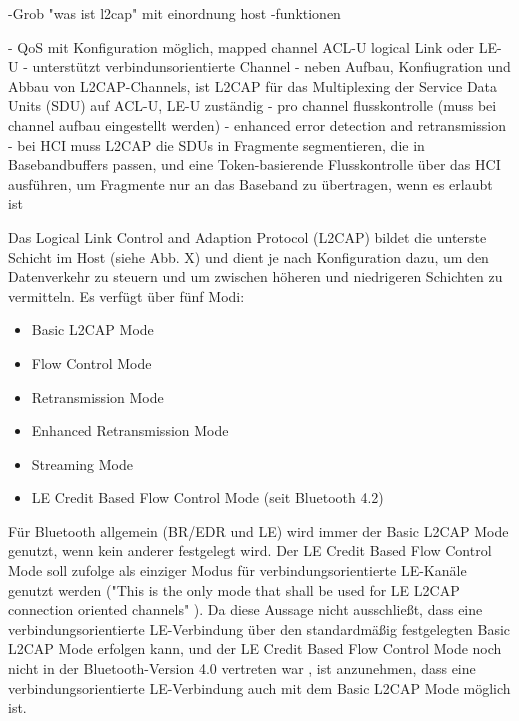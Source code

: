 -Grob "was ist l2cap" mit einordnung host
-funktionen

- QoS mit Konfiguration möglich, mapped channel ACL-U logical Link oder LE-U
- unterstützt verbindunsorientierte Channel
- neben Aufbau, Konfiugration und Abbau von L2CAP-Channels, ist L2CAP für das Multiplexing der Service Data Units (SDU) auf ACL-U, LE-U zuständig
- pro channel flusskontrolle (muss bei channel aufbau eingestellt werden)
- enhanced error detection and retransmission
- bei HCI muss L2CAP die SDUs in Fragmente segmentieren, die in Basebandbuffers passen, und eine Token-basierende Flusskontrolle über das HCI ausführen, um Fragmente nur an das Baseband zu übertragen, wenn es erlaubt ist

Das Logical Link Control and Adaption Protocol (L2CAP) bildet die unterste Schicht im Host (siehe Abb. X) 
und dient je nach Konfiguration dazu, um den Datenverkehr zu steuern und um zwischen höheren und niedrigeren Schichten zu vermitteln.
Es verfügt über fünf Modi:
\begin{itemize}
    \item Basic L2CAP Mode
    \item Flow Control Mode
    \item Retransmission Mode
    \item Enhanced Retransmission Mode
    \item Streaming Mode
    \item LE Credit Based Flow Control Mode (seit Bluetooth 4.2)
\end{itemize}
Für Bluetooth allgemein (BR/EDR und LE) wird immer der Basic L2CAP Mode genutzt, wenn kein anderer festgelegt wird. Der LE Credit Based Flow Control Mode soll \cite{BtSpec4.2_1735} zufolge als einziger Modus für verbindungsorientierte LE-Kanäle genutzt werden ("This is the only mode that shall be used for LE L2CAP connection oriented channels" \cite{BtSpec4.2_1735}). Da diese Aussage nicht ausschließt, dass eine verbindungsorientierte LE-Verbindung über den standardmäßig festgelegten Basic L2CAP Mode erfolgen kann, und der LE Credit Based Flow Control Mode noch nicht in der Bluetooth-Version 4.0 vertreten war \cite{BtSpec4.0_1401}, ist anzunehmen, dass eine verbindungsorientierte LE-Verbindung auch mit dem Basic L2CAP Mode möglich ist.

